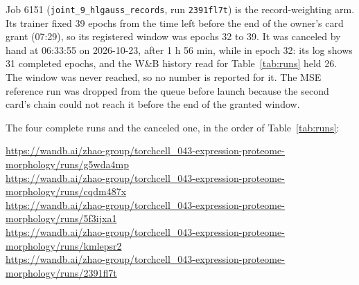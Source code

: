 Job 6151 (\texttt{joint\_9\_hlgauss\_records}, run \texttt{2391fl7t}) is the record-weighting
arm. Its trainer fixed 39 epochs from the time left before the end of the owner's card grant (07:29), so its
registered window was epochs 32 to 39. It was canceled by hand at 06:33:55 on 2026-10-23,
after 1 h 56 min, while in epoch 32: its log shows 31 completed epochs, and the W\&B history
read for Table~\ref{tab:runs} held 26. The window was never reached, so no number is reported
for it. The MSE reference run was dropped from the queue before launch because the second
card's chain could not reach it before the end of the granted window.

The four complete runs and the canceled one, in the order of Table~\ref{tab:runs}:

\begingroup\footnotesize
\noindent\url{https://wandb.ai/zhao-group/torchcell_043-expression-proteome-morphology/runs/g5wda4mp}\\
\url{https://wandb.ai/zhao-group/torchcell_043-expression-proteome-morphology/runs/cqdm487x}\\
\url{https://wandb.ai/zhao-group/torchcell_043-expression-proteome-morphology/runs/5f3ijxa1}\\
\url{https://wandb.ai/zhao-group/torchcell_043-expression-proteome-morphology/runs/kmlepsr2}\\
\url{https://wandb.ai/zhao-group/torchcell_043-expression-proteome-morphology/runs/2391fl7t}\par
\endgroup

